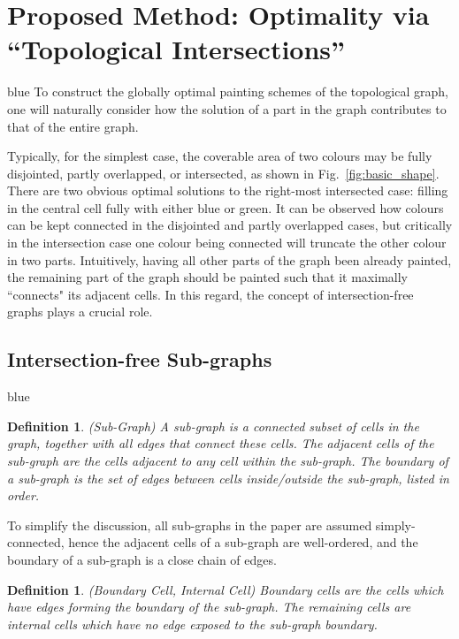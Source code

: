 \documentclass[journal]{IEEEtran}
\newtheorem{definition}[theorem]{Definition}
\begin{document}
\section{Proposed Method: Optimality via ``Topological Intersections''}
\label{section_intersection}

\begin{color}{blue}
To construct the globally optimal painting schemes of the topological graph, one will naturally consider how the solution of a part in the graph contributes to that of the entire graph. 
\end{color}
Typically, for the simplest case, the coverable area of two colours may be fully disjointed, partly overlapped, or intersected, as shown in Fig.~\ref{fig:basic_shape}. 
There are two obvious optimal solutions to the right-most intersected case: 
filling in the central cell fully with either blue or green. 
It can be observed how colours can be kept connected in the disjointed and partly overlapped cases, but critically in the intersection case one colour being connected will truncate the other colour in two parts.
Intuitively, having all other parts of the graph been already painted, the remaining part of the graph should be painted such that it maximally ``connects" its adjacent cells. 
In this regard, the concept of intersection-free graphs plays a crucial role.  


\subsection{Intersection-free Sub-graphs}
\begin{color}{blue}
\begin{definition}
(Sub-Graph) A sub-graph is a connected subset of cells in the graph, together with all edges that connect these cells. 
The adjacent cells of the sub-graph are the cells adjacent to any cell within the sub-graph. 
The boundary of a sub-graph is the set of edges between cells inside/outside the sub-graph, listed in order. 
\end{definition}
To simplify the discussion, all sub-graphs in the paper are assumed simply-connected, hence the adjacent cells of a sub-graph are well-ordered, and the boundary of a sub-graph is a close chain of edges. 
\end{color}

\begin{definition}
(Boundary Cell, Internal Cell) Boundary cells are the cells which have edges forming the boundary of the sub-graph. The remaining cells are internal cells which have no edge exposed to the sub-graph boundary. 
\end{definition}
\end{document}
